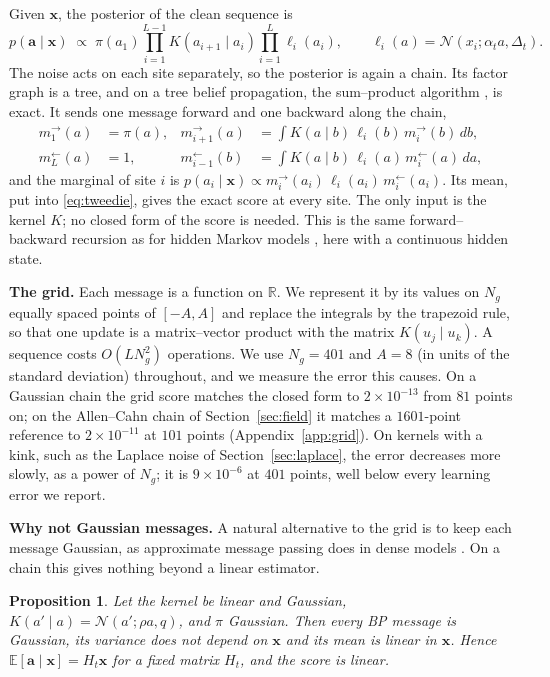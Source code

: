 \documentclass[11pt,a4paper]{article}
\newtheorem{proposition}{Proposition}
\newcommand{\E}{\mathbb{E}}
\newcommand{\N}{\mathcal{N}}
\newcommand{\va}{\mathbf{a}}
\newcommand{\vx}{\mathbf{x}}
\begin{document}
Given $\vx$, the posterior of the clean sequence is
\[
p(\va\mid\vx)\;\propto\;\pi(a_1)\prod_{i=1}^{L-1}K(a_{i+1}\mid a_i)\prod_{i=1}^{L}\ell_i(a_i),\qquad
\ell_i(a)=\N(x_i;\alpha_t a,\Delta_t).
\]
The noise acts on each site separately, so the posterior is again a chain. Its factor graph is a tree, and on a tree belief
propagation, the sum--product algorithm \citep{pearl1988probabilistic,kschischang2001factor,mezard2009information}, is
exact. It sends one message forward and one backward along the chain,
\begin{align*}
m^{\rightarrow}_{1}(a)&=\pi(a), & m^{\rightarrow}_{i+1}(a)&=\int K(a\mid b)\,\ell_i(b)\,m^{\rightarrow}_{i}(b)\,db,\\
m^{\leftarrow}_{L}(a)&=1, & m^{\leftarrow}_{i-1}(b)&=\int K(a\mid b)\,\ell_i(a)\,m^{\leftarrow}_{i}(a)\,da,
\end{align*}
and the marginal of site $i$ is $p(a_i\mid\vx)\propto m^{\rightarrow}_i(a_i)\,\ell_i(a_i)\,m^{\leftarrow}_i(a_i)$. Its mean,
put into \eqref{eq:tweedie}, gives the exact score at every site. The only input is the kernel $K$; no closed form of the score
is needed. This is the same forward--backward recursion as for hidden Markov models \citep{rabiner1989tutorial}, here with a
continuous hidden state.

\textbf{The grid.} Each message is a function on $\mathbb R$. We represent it by its values on $N_g$ equally spaced points
of $[-A,A]$ and replace the integrals by the trapezoid rule, so that one update is a matrix--vector product with the matrix
$K(u_j\mid u_k)$. A sequence costs $O(LN_g^2)$ operations. We use $N_g=401$ and $A=8$ (in units of the standard deviation)
throughout, and we measure the error this causes. On a Gaussian chain the grid score matches the closed form to $2\times10^{-13}$
from $81$ points on; on the Allen--Cahn chain of Section~\ref{sec:field} it matches a $1601$-point reference to
$2\times10^{-11}$ at $101$ points (Appendix~\ref{app:grid}). On kernels with a kink, such as the Laplace noise of
Section~\ref{sec:laplace}, the error decreases more slowly, as a power of $N_g$; it is $9\times10^{-6}$ at $401$ points, well
below every learning error we report.

\textbf{Why not Gaussian messages.} A natural alternative to the grid is to keep each message Gaussian, as approximate message
passing does in dense models \citep{thouless1977solution,donoho2009message}. On a chain this gives nothing beyond a linear
estimator.

\begin{proposition}
Let the kernel be linear and Gaussian, $K(a'\mid a)=\N(a';\rho a,q)$, and $\pi$ Gaussian. Then every BP message is
Gaussian, its variance does not depend on $\vx$ and its mean is linear in $\vx$. Hence $\E[\va\mid\vx]=H_t\vx$ for a fixed
matrix $H_t$, and the score is linear.
\end{proposition}
\end{document}
